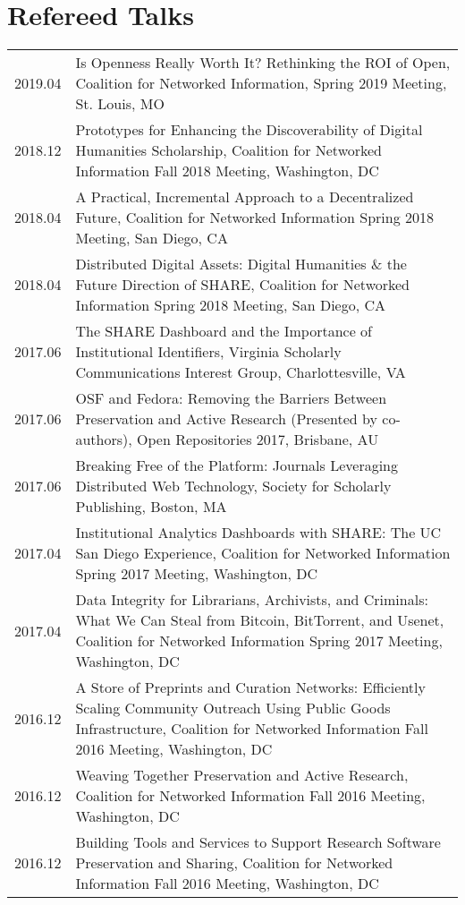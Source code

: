 \documentclass[11pt]{article}
\begin{document}
\section*{Refereed Talks}
\begin{tabularx}{\textwidth}{lX}
    2019.04 & Is Openness Really Worth It? Rethinking the ROI of Open, Coalition for Networked Information, Spring 2019 Meeting, St. Louis, MO\\
    2018.12 & Prototypes for Enhancing the Discoverability of Digital Humanities Scholarship, Coalition for Networked Information Fall 2018 Meeting, Washington, DC\\
    2018.04 & A Practical, Incremental Approach to a Decentralized Future, Coalition for Networked Information Spring 2018 Meeting, San Diego, CA\\
    2018.04 & Distributed Digital Assets: Digital Humanities \& the Future Direction of SHARE, Coalition for Networked Information Spring 2018 Meeting, San Diego, CA\\
    2017.06    & The SHARE Dashboard and the Importance of Institutional Identifiers, Virginia Scholarly Communications Interest Group, Charlottesville, VA \\
    2017.06    & OSF and Fedora: Removing the Barriers Between Preservation and Active Research (Presented by co-authors), Open Repositories 2017, Brisbane, AU \\
    2017.06    & Breaking Free of the Platform: Journals Leveraging Distributed Web Technology, Society for Scholarly Publishing, Boston, MA\\
    2017.04    & Institutional Analytics Dashboards with SHARE: The UC San Diego Experience, Coalition for Networked Information Spring 2017 Meeting, Washington, DC\\
    2017.04    & Data Integrity for Librarians, Archivists, and Criminals: What We Can Steal from Bitcoin, BitTorrent, and Usenet, Coalition for Networked Information Spring 2017 Meeting, Washington, DC\\
    2016.12    & A Store of Preprints and Curation Networks: Efficiently Scaling Community Outreach Using Public Goods Infrastructure, Coalition for Networked Information Fall 2016 Meeting, Washington, DC\\
    2016.12    & Weaving Together Preservation and Active Research, Coalition for Networked Information Fall 2016 Meeting, Washington, DC\\
    2016.12    & Building Tools and Services to Support Research Software Preservation and Sharing,  Coalition for Networked Information Fall 2016 Meeting, Washington, DC\\

\end{tabularx}
\end{document}
